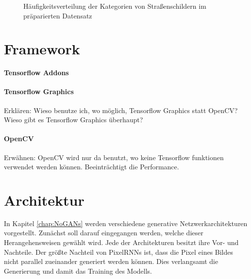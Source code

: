 \begin{figure}
\caption{Häufigkeitsverteilung der Kategorien von Straßenschildern im präparierten Datensatz}
\end{figure}

\section{Framework}
\paragraph{Tensorflow Addons}
\paragraph{Tensorflow Graphics}
Erklären: Wieso benutze ich, wo möglich, Tensorflow Graphics statt OpenCV? Wieso gibt es Tensorflow Graphics überhaupt?
\paragraph{OpenCV}
Erwähnen: OpenCV wird nur da benutzt, wo keine Tensorflow funktionen verwendet werden können. Beeinträchtigt die Performance.

\section{Architektur}
In Kapitel \ref{chap:NoGANs} werden verschiedene generative Netzwerkarchitekturen vorgestellt. Zunächst soll darauf eingegangen werden, welche dieser Herangehensweisen gewählt wird. Jede der Architekturen besitzt ihre Vor- und Nachteile. Der größte Nachteil von \acp{PixelRNN} ist, dass die Pixel eines Bildes nicht parallel zueinander generiert werden können. Dies verlangsamt die Generierung und damit das Training des Modells.

